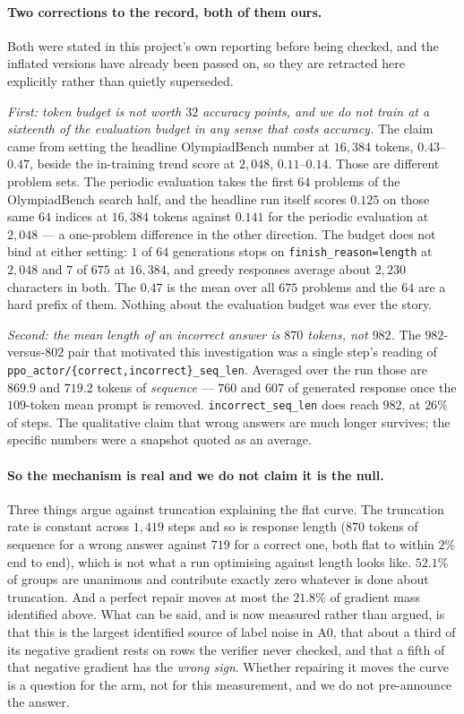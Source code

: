 \paragraph{Two corrections to the record, both of them ours.} Both were stated in this
project's own reporting before being checked, and the inflated versions have already been
passed on, so they are retracted here explicitly rather than quietly superseded.

\emph{First: token budget is not worth $32$ accuracy points, and we do not train at a
sixteenth of the evaluation budget in any sense that costs accuracy.} The claim came from
setting the headline OlympiadBench number at $16{,}384$ tokens, $0.43$--$0.47$, beside the
in-training trend score at $2{,}048$, $0.11$--$0.14$. Those are different problem sets. The
periodic evaluation takes the first $64$ problems of the OlympiadBench search half, and the
headline run itself scores $\mathbf{0.125}$ on those same $64$ indices at $16{,}384$ tokens
against $\mathbf{0.141}$ for the periodic evaluation at $2{,}048$ --- a one-problem
difference in the other direction. The budget does not bind at either setting: $1$ of $64$
generations stops on \texttt{finish\_reason=length} at $2{,}048$ and $7$ of $675$ at
$16{,}384$, and greedy responses average about $2{,}230$ characters in both. The $0.47$ is
the mean over all $675$ problems and the $64$ are a hard prefix of them. Nothing about the
evaluation budget was ever the story.

\emph{Second: the mean length of an incorrect answer is $870$ tokens, not $982$.} The
$982$-versus-$802$ pair that motivated this investigation was a single step's reading of
\texttt{ppo\_actor/\{correct,incorrect\}\_seq\_len}. Averaged over the run those are
$\mathbf{869.9}$ and $\mathbf{719.2}$ tokens of \emph{sequence} --- $760$ and $607$ of
generated response once the $109$-token mean prompt is removed. \texttt{incorrect\_seq\_len}
does reach $982$, at $26\%$ of steps. The qualitative claim that wrong answers are much
longer survives; the specific numbers were a snapshot quoted as an average.

\paragraph{So the mechanism is real and we do not claim it is the null.} Three things argue
against truncation explaining the flat curve. The truncation rate is constant across $1{,}419$
steps and so is response length ($870$ tokens of sequence for a wrong answer against $719$ for
a correct one, both flat to within $2\%$ end to end), which is not what a run optimising
against length looks like. $52.1\%$ of groups are unanimous and contribute exactly zero
whatever is done about truncation. And a perfect repair moves at most the $21.8\%$ of gradient
mass identified above. What can be said, and is now measured rather than argued, is that this is the
largest identified source of label noise in A0, that about a third of its negative gradient
rests on rows the verifier never checked, and that a fifth of that negative gradient has the
\emph{wrong sign}. Whether repairing it moves the curve is a question for the arm, not for
this measurement, and we do not pre-announce the answer.

